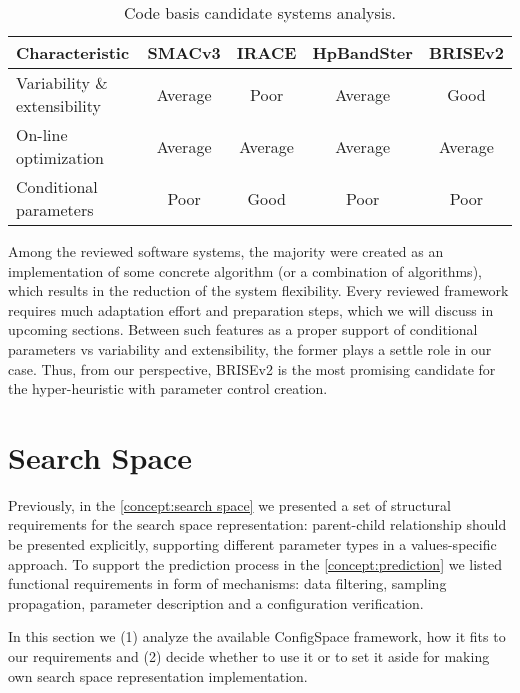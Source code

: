 \begin{table}[h!]
	\centering
	\begin{tabular}{l||cccc}
		\textbf{Characteristic} & \textbf{SMACv3}& \textbf{IRACE} & \textbf{HpBandSter} & \textbf{BRISEv2} \\
		\hline
		\hline
		Variability \& extensibility & \cellcolor{yellow!25}Average & \cellcolor{red!25}Poor & \cellcolor{yellow!25}Average & \cellcolor{green!25}Good \\
	
		On-line optimization & \cellcolor{yellow!25}Average & \cellcolor{yellow!25}Average & \cellcolor{yellow!25}Average & \cellcolor{yellow!25}Average \\
	
		Conditional parameters & \cellcolor{red!25}Poor & \cellcolor{green!25}Good & \cellcolor{red!25}Poor & \cellcolor{red!25}Poor \\
	\end{tabular}
	\caption{Code basis candidate systems analysis.}
	\label{iml: table code basis selection}
\end{table}

Among the reviewed software systems, the majority were created as an implementation of some concrete algorithm (or a combination of algorithms), which results in the reduction of the system flexibility. Every reviewed framework requires much adaptation effort and preparation steps, which we will discuss in upcoming sections. Between such features as a proper support of conditional parameters vs variability and extensibility, the former plays a settle role in our case. Thus, from our perspective, BRISEv2 is the most promising candidate for the hyper-heuristic with parameter control creation.

\section{Search Space}\label{impl: search space}
Previously, in the \cref{concept:search space} we presented a set of structural requirements for the search space representation: parent-child relationship should be presented explicitly, supporting different parameter types in a values-specific approach. To support the prediction process in the \cref{concept:prediction} we listed functional requirements in form of mechanisms: data filtering, sampling propagation, parameter description and a configuration verification.

In this section we (1) analyze the available ConfigSpace framework, how it fits to our requirements and (2) decide whether to use it or to set it aside for making own search space representation implementation.

